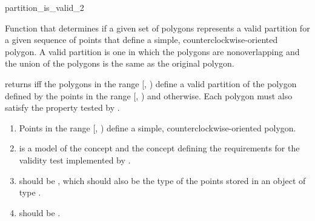 \renewcommand\ccRefPageBegin{\ccParDims\cgalColumnLayout\begin{ccAdvanced}}
\renewcommand\ccRefPageEnd{\ccParDims\cgalColumnLayout\end{ccAdvanced}}
\begin{ccRefFunction}{partition_is_valid_2}

\ccDefinition

Function that determines if a given set of polygons represents
a valid partition for a given sequence of points that 
define a simple, counterclockwise-oriented polygon.  A valid partition is one in
which the polygons are nonoverlapping and the union of the polygons is the 
same as the original polygon.


{
returns  iff the polygons in the range [, 
) define a valid partition of the polygon defined by the 
points in the range [, ) and 
 otherwise.  
Each polygon must also satisfy the property 
tested by . 
}

\begin{enumerate}
    \item Points in the range [, ) define
          a simple, counterclockwise-oriented polygon.
    \item {} is a model of the concept 
           and the
          concept defining the requirements for the validity test 
          implemented by .
    \item {} should be ,
          which should also be the type of the points stored in an object
          of type .
    \item {} should be 
          .
\end{enumerate}


\end{ccRefFunction}
